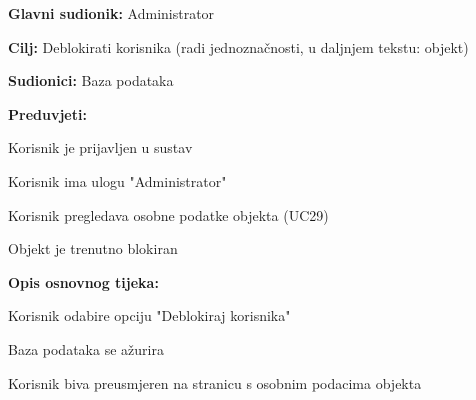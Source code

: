 					\noindent {}
					\begin{packed_item}
	
						\item \textbf{Glavni sudionik: }Administrator
						\item  \textbf{Cilj:} Deblokirati korisnika (radi jednoznačnosti, u daljnjem tekstu: objekt)
						\item  \textbf{Sudionici:} Baza podataka
						\item  \textbf{Preduvjeti:}
						\item[] \begin{packed_enum}
							\item Korisnik je prijavljen u sustav
							\item Korisnik ima ulogu "Administrator"
							\item Korisnik pregledava osobne podatke objekta (UC29)
							\item Objekt je trenutno blokiran
						\end{packed_enum}
						\item  \textbf{Opis osnovnog tijeka:}
						
						\item[] \begin{packed_enum}
	
							\item Korisnik odabire opciju "Deblokiraj korisnika"
							\item Baza podataka se ažurira
							\item Korisnik biva preusmjeren na stranicu s osobnim podacima objekta
						\end{packed_enum}
						
					\end{packed_item}
					
